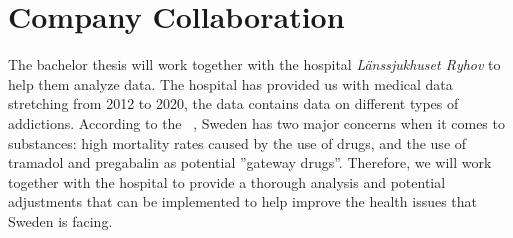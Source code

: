 \section{Company Collaboration}
The bachelor thesis will work together with the hospital \textit{Länssjukhuset Ryhov} to help them analyze data. The hospital has provided us with medical data stretching from 2012 to 2020, the data contains data on different types of addictions. According to the ~\cite{medData}, Sweden has two major concerns when it comes to substances: high mortality rates caused by the use of drugs, and the use of tramadol and pregabalin as potential ”gateway drugs”. Therefore, we will work together with the hospital to provide a thorough analysis and potential adjustments that can be implemented to help improve the health issues that Sweden is facing. 

	






